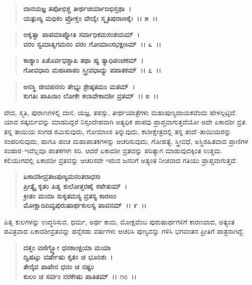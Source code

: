 \begin{verse}
\textbf{ದಾನಯಜ್ಞ ತಪೋಭಿಶ್ಚ ತೀರ್ಥಚರ್ಯಾದಿಭಿಸ್ತಥಾ~।}\\\textbf{ಯತ್ಪುಣ್ಯ ಮಧಿಕಂ ಪ್ರೋಕ್ತಂ ವೇದೈಃ ಸ್ಮೃತಿಪುರಾಣಕೈಃ~।। ೫~।।}
\end{verse}

\begin{verse}
\textbf{ಅಕೃತ್ವಾ ಪಾಪಮಾಪ್ನೋತಿ ಸರ್ವಾಧಿಕಮಸಂಶಯಮ್~।}\\\textbf{ವರಂ ಸ್ವಮಾತೃಗಮನಂ ವರಂ ಗೋಮಾಂಸಭಕ್ಷಣಮ್~।। ೬~।।}
\end{verse}

\begin{verse}
\textbf{ಕಾಶ್ಯಾಂ ಪಿತೊರ್ವಧಶ್ಚಾಪಿ ತಥಾ ಹ್ಯ ತ್ಯಾಧಿಪಂಚಕಮ್~।}\\\textbf{ಗೋವಧಾದಿ ಮಹಾಪಾಪಂ ಸ್ತ್ರೀವಧಾದ್ಯು ಪಪಾತಕಮ್~।। ೭~।। }
\end{verse}

\begin{verse}
\textbf{ಅನಸ್ಥಿ ಜೀವಹನನಂ ತೇಭ್ಯಃ ಶ್ರೇಷ್ಠತಮಂ ಮತಮ್~।}\\\textbf{ಕುಗತಿಃ ಪಾಪಿನಾಂ ಲೋಕೇ ಕಲಾವೇಕಾದಶೀ ವ್ರತಮ್~।। ೮~।।}
\end{verse}

ವೇದ, ಸ್ಮತಿ, ಪುರಾಣಗಳಲ್ಲಿ ದಾನ, ಯಜ್ಞ, ತಪಸ್ಸು, ತೀರ್ಥಯಾತ್ರೆಗಳು ಮಹಾಪುಣ್ಯದಾಯಕವೆಂದು ಹೇಳಲ್ಪಟ್ಟಿದೆ. ಯಾವ ಸತ್ಕರ್ಮವನ್ನು ಮಾಡದಿದ್ದರೆ ನಿಸ್ಸಂದೇಹವಾಗಿ ಅತ್ಯಧಿಕ ಪಾಪವು ಪ್ರಾಪ್ತವಾಗುತ್ತದೆಯೋ ಅದೇ ಏಕಾದಶೀ ವ್ರತ. ತನ್ನ ತಾಯಿಯ ಸಂಗಡ ರಮಿಸುವುದು, ಗೋಮಾಂಸ ತಿನ್ನುವುದು, ಕಾಶೀಕ್ಷೇತ್ರದಲ್ಲಿ ತನ್ನ ತಂದೆ–ತಾಯಿಯರನ್ನು ಸಂಹರಿಸುವುದು, ಹಾಗೂ ಪಂಚ ಮಹಾಪಾತಕಗಳನ್ನು ಆಚರಿಸುವುದು, ಗೋಹತ್ಯೆ, ಸ್ತ್ರೀವಧೆ, ಅಸ್ಥಿರಹಿತವಾದ ಪ್ರಾಣಿಗಳ ಸಂಹಾರ–ಇವೆಲ್ಲವೂ ಪಾತಕಗಳೇ ಸರಿ. ಆದರೆ ಏಕಾದಶೀ ವ್ರತವನ್ನು ಪರಿತ್ಯಾಗ ಮಾಡುವುದಕ್ಕಿಂತ ಉತ್ತಮ. ಕಲಿಯುಗದಲ್ಲಿ ಏಕಾದಶೀ ವ್ರತವನ್ನು ಆಚರಿಸದೇ ಇರುವ ಜನರಿಗೆ ಅತ್ಯಂತ ನೀಚವಾದ ಗತಿಯು ಪ್ರಾಪ್ತವಾಗುತ್ತದೆ.

\begin{verse}
\textbf{ಏಕಾದಶೀವ್ರತಜಪುಣ್ಯಮನಂತರಾಧಸಃ} \\\textbf{ಪ್ರೀತ್ಯೈ ಕೃತಂ ಪಿತೃ ಕುಲೋತ್ತರಣೈ ಕಹೇತುಮ್~।}\\\textbf{ಕ್ರೀತಂ ಮಯಾ ಸುಕೃತಮಸ್ಯ ವ್ರತಸ್ಯ ಕಾರಣಂ} \\\textbf{ಮೋಕ್ಷಾದಿದಿವ್ಯಪುರುಷಾರ್ಥಕುಲಸ್ಯ ಪಾವನಮ್~।। ೯~।।}
\end{verse}

ಪಿತೃ ಕುಲಗಳನ್ನು ಉದ್ಧರಿಸುವ, ಧರ್ಮ, ಅರ್ಥ ಕಾಮ, ಮೋಕ್ಷವೆಂಬ ಪುರುಷಾರ್ಥಗಳಿಗೆ ಕಾರಣವಾದ, ಅತ್ಯಂತ ಪವಿತ್ರವಾದ ಏಕಾದಶೀವ್ರತವನ್ನು ಹನ್ನೆರಡು ವರ್ಷಗಳು ಆಚರಿಸಿ ಪುಣ್ಯವನ್ನು ಗಳಿಸಿ ಭಗವಂತನ ಪ್ರೀತಿಗೆ ಪಾತ್ರನಾಗಿದ್ದೆ.

\begin{verse}
\textbf{ದತ್ತಂ ವಣಿಗ್ಭ್ಯೋ ಧನಕಾಂಕ್ಷಯಾ ಮಯಾ} \\\textbf{ದ್ವಿಷಟ್ಸು ವರ್ಷೇಷು ಕೃತಂ ಚ ಭೂರಿಶಃ~।}\\\textbf{ತೇನೈವ ಪಾಪೇನ ಧನಂ ಚ ನಷ್ಟಂ} \\\textbf{ಕುಲಂ ಚ ಸರ್ವಂ ನರಕೇಷು ಪಾತಿತಮ್~।। ೧೦~।।}
\end{verse}

